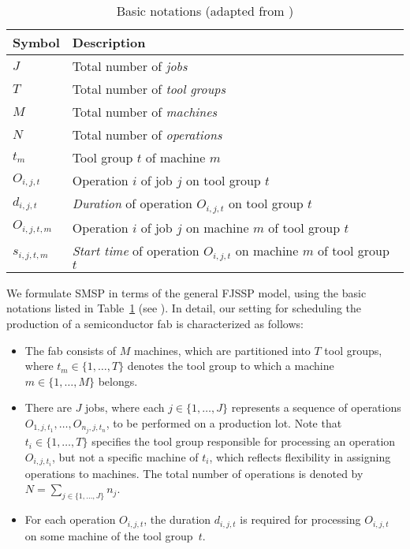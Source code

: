 \begin{table*}[t]
	\caption{Basic notations (adapted from \cite{Ali2024})}\label{notations} \centering
	\begin{tabular}{|l|l|}
		\hline
		Symbol & Description \\ \hline
		$J$ & Total number of \emph{jobs}        \\
		$T$ & Total number of \emph{tool groups} \\
		$M$ & Total number of \emph{machines}    \\
		$N$ & Total number of \emph{operations} \\
		$t_{m}$ & Tool group $t$ of machine $m$ \\
		$O_{i,j,t}$ & Operation $i$ of job $j$ on tool group $t$  \\
		$d_{i,j,t}$ & \emph{Duration} of operation $O_{i,j,t}$ on tool group $t$ \\
		$O_{i,j,t,m}$ & Operation $i$ of job $j$ on machine $m$ of tool group $t$  \\
		$s_{i,j,t,m}$ & \emph{Start time} of operation $O_{i,j,t}$ on machine $m$ of tool group $t$  \\
		\hline
	\end{tabular}
\end{table*}

We formulate SMSP in terms of the general FJSSP model,
using the basic notations listed in Table~\ref{notations} (see \cite{Ali2024}). 
In detail, our setting for scheduling the production of a semiconductor fab is characterized as follows:

\begin{itemize}
	\item The fab consists of $M$ machines, which are partitioned into $T$
	tool groups, where $t_m\in\{1,\dots,T\}$ denotes the tool group
	to which a machine $m\in\{1,\dots,M\}$ belongs.
	\item There are $J$ jobs, where each $j\in\{1,\dots,J\}$ represents a
	sequence of operations $O_{1,j,t_1},\dots,O_{n_j,j,t_n}$, to be performed on a production lot.
	Note that $t_i\in\{1,\dots,T\}$ specifies the tool group 
	responsible for processing an operation $O_{i,j,t_i}$, %
	but not a specific machine of $t_i$,
	which reflects flexibility in assigning operations to machines.
	The total number of operations is denoted by
	$N = \sum_{j\in\{1,\dots,J\}}n_j$.
	\item For each operation $O_{i,j,t}$,
	the duration $d_{i,j,t}$ is required for processing $O_{i,j,t}$
	on some machine of the tool group~$t$.
\end{itemize}

